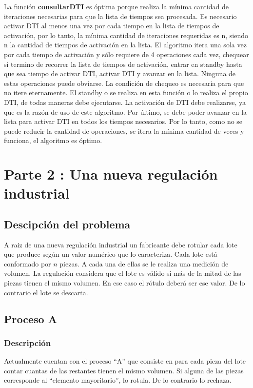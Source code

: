 \documentclass{article}
\begin{document}
La función \textbf{consultarDTI} es óptima porque realiza la mínima cantidad de iteraciones necesarias para que la 
lista de tiempos sea procesada. Es necesario activar DTI al menos una vez por cada tiempo en 
la lista de tiempos de activación, por lo tanto, la mínima cantidad de iteraciones 
requeridas es n, siendo n la cantidad de tiempos de activación en la lista. 
El algoritmo itera una sola vez por cada tiempo de activación y sólo requiere de 4 
operaciones cada vez, chequear si termino de recorrer la lista de tiempos de activación, 
entrar en standby hasta que sea tiempo de activar DTI, activar DTI y avanzar en la lista. 
Ninguna de estas operaciones puede obviarse. La condición de chequeo es necesaria para que no 
itere eternamente. El standby o se realiza en esta función o lo realiza el propio DTI, 
de todas maneras debe ejecutarse. La activación de DTI debe realizarse, ya que es la razón 
de uso de este algoritmo. 
Por último, se debe poder avanzar en la lista para activar DTI en todos los tiempos necesarios. 
Por lo tanto, como no se puede reducir la cantidad de operaciones, 
se itera la mínima cantidad de veces y funciona, el algoritmo es óptimo.


\newpage
\section{Parte 2 : Una nueva regulación industrial}

\subsection{Descipción del problema}
A raiz de una nueva regulación industrial un fabricante debe rotular cada lote que produce según un valor numérico que lo caracteriza. 
Cada lote está conformado por \(n\) piezas. A cada una de ellas se le realiza una medición de volumen. La regulación considera que el lote es válido si más de la mitad de las piezas tienen el mismo volumen. 
En ese caso el rótulo deberá ser ese valor. De lo contrario el lote se descarta.

\subsection{Proceso A}

\subsubsection{Descripción}
Actualmente cuentan con el proceso “A” que consiste en para cada pieza del lote contar cuantas de las restantes tienen el mismo volumen. 
Si alguna de las piezas corresponde al “elemento mayoritario”, lo rotula. De lo contrario lo rechaza.
\end{document}
